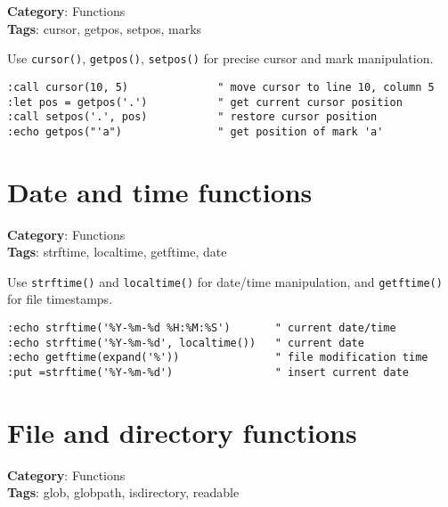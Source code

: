 {\textbf{Category}: Functions\\ \textbf{Tags}: cursor, getpos, setpos, marks
\vspace{0.5cm}

Use {\footnotesize \Verb§cursor()§}, {\footnotesize \Verb§getpos()§}, {\footnotesize \Verb§setpos()§} for precise cursor and mark manipulation.

\begin{Exa*}{}
\begin{Verbatim}[fontsize=\footnotesize, breaklines, breakanywhere]
:call cursor(10, 5)              " move cursor to line 10, column 5
:let pos = getpos('.')           " get current cursor position
:call setpos('.', pos)           " restore cursor position
:echo getpos("'a")               " get position of mark 'a'
\end{Verbatim}
\end{Exa*}

\section{Date and time functions}

\textbf{Category}: Functions\\ \textbf{Tags}: strftime, localtime, getftime, date
\vspace{0.5cm}

Use {\footnotesize \Verb§strftime()§} and {\footnotesize \Verb§localtime()§} for date/time manipulation, and {\footnotesize \Verb§getftime()§} for file timestamps.

\begin{Exa*}{}
\begin{Verbatim}[fontsize=\footnotesize, breaklines, breakanywhere]
:echo strftime('%Y-%m-%d %H:%M:%S')       " current date/time
:echo strftime('%Y-%m-%d', localtime())   " current date
:echo getftime(expand('%'))               " file modification time
:put =strftime('%Y-%m-%d')                " insert current date
\end{Verbatim}
\end{Exa*}

\section{File and directory functions}

\textbf{Category}: Functions\\ \textbf{Tags}: glob, globpath, isdirectory, readable
\vspace{0.5cm}

}
